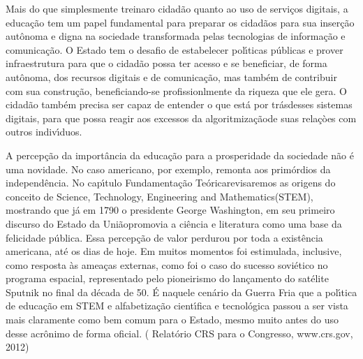 \documentclass[
12pt,		%
openright,	%
twoside,  %
a4paper,			%
chapter=TITLE,		%
english,			%
french,				%
spanish,			%
brazil				%
]{USPSC-classe/USPSC_RedarTex}
\begin{document}
Mais do que simplesmente \textquotedbl treinar\textquotedbl  o cidad\~ao quanto ao uso  de servi\c{c}os digitais, a educa\c{c}\~ao tem um papel fundamental para preparar os cidad\~aos para sua inser\c{c}\~ao aut\^onoma e digna na sociedade transformada pelas tecnologias de informa\c{c}\~ao e comunica\c{c}\~ao. O Estado tem o desafio de estabelecer pol\'{\i}ticas p\'ublicas e prover infraestrutura para que o cidad\~ao possa ter acesso e se beneficiar, de forma aut\^onoma, dos recursos digitais e de comunica\c{c}\~ao, mas tamb\'em de contribuir com sua constru\c{c}\~ao, beneficiando-se profissionlmente da riqueza que ele gera. O cidad\~ao tamb\'em precisa ser capaz de entender \textquotedbl o que est\'a por tr\'as\textquotedbl  desses sistemas digitais, para que possa reagir aos excessos da \textquotedbl algoritmiza\c{c}\~ao\textquotedbl  de suas rela\c{c}òes com outros indiv\'{\i}duos.








A percep\c{c}\~ao da import\^ancia da educa\c{c}\~ao para a prosperidade da sociedade n\~ao \'e uma novidade. No caso americano, por exemplo, remonta aos prim\'ordios da independ\^encia. No cap\'{\i}tulo \textquotedbl Fundamenta\c{c}\~ao Te\'orica\textquotedbl  revisaremos as origens do conceito de \textquotedbl Science, Technology, Engineering and Mathematics\textquotedbl  (STEM), mostrando que j\'a em 1790 o presidente George Washington, em seu primeiro discurso do \textquotedbl Estado da Uni\~ao\textquotedbl  promovia a ci\^encia e literatura como uma base da \textquotedbl felicidade p\'ublica\textquotedbl  [XXX]. Essa percep\c{c}\~ao de valor perdurou por toda a exist\^encia americana, at\'e os dias de hoje. Em muitos momentos foi estimulada, inclusive, como resposta \`as amea\c{c}as externas, como foi o caso do sucesso sovi\'etico no programa espacial, representado pelo pioneirismo do lan\c{c}amento do sat\'elite Sputnik no final da d\'ecada de 50. \'E naquele cen\'ario da Guerra Fria que a pol\'{\i}tica de educa\c{c}\~ao em STEM e alfabetiza\c{c}\~ao cient\'{\i}fica e tecnol\'ogica passou a ser vista mais claramente como bem comum para o Estado, mesmo muito antes do uso desse acr\^onimo de forma oficial. ( Relat\'orio CRS para o Congresso, www.crs.gov, 2012)
\end{document}
